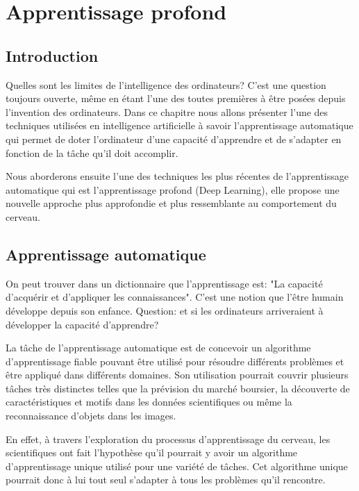 
\chapter{Apprentissage profond}

\section{Introduction}

	Quelles sont les limites de l'intelligence des ordinateurs? C'est une question toujours ouverte, même en étant l'une des toutes premières à être posées depuis l'invention des ordinateurs. Dans ce chapitre nous allons présenter l'une des techniques utilisées en intelligence artificielle à savoir l'apprentissage automatique qui permet de doter l'ordinateur d'une capacité d'apprendre et de s'adapter en fonction de la tâche qu'il doit accomplir.
	
	Nous aborderons ensuite l'une des techniques les plus récentes de l'apprentissage automatique qui est l'apprentissage profond (Deep Learning), elle propose une nouvelle approche plus approfondie et plus ressemblante au comportement du cerveau.


\section{Apprentissage automatique}

	On peut trouver dans un dictionnaire que l'apprentissage est: "La capacité d'acquérir et d'appliquer les connaissances". C'est une notion que l'être humain développe depuis son enfance. Question: et si les ordinateurs arriveraient à développer la capacité d'apprendre?

	La tâche de l'apprentissage automatique est de concevoir un algorithme d'apprentissage fiable pouvant être utilisé pour résoudre différents problèmes et être appliqué dans différents domaines. Son utilisation pourrait couvrir plusieurs tâches très distinctes telles que la prévision du marché boursier, la découverte de caractéristiques et motifs dans les données scientifiques ou même la reconnaissance d'objets dans les images.

	En effet, à travers l'exploration du processus d'apprentissage du cerveau, les scientifiques ont fait l'hypothèse qu'il pourrait y avoir un algorithme d'apprentissage unique utilisé pour une variété de tâches. Cet algorithme unique pourrait donc à lui tout seul s'adapter à tous les problèmes qu'il rencontre. 

